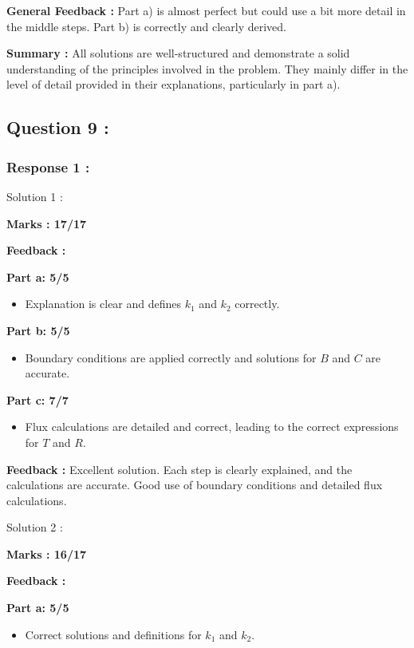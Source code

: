 \documentclass[a4paper,11pt]{article}
\begin{document}
\textbf{General Feedback :}
Part a) is almost perfect but could use a bit more detail in the middle steps. Part b) is correctly and clearly derived.

\textbf{Summary :}
All solutions are well-structured and demonstrate a solid understanding of the principles involved in the problem. They mainly differ in the level of detail provided in their explanations, particularly in part a).



\subsection*{Question 9 :}

\subsubsection*{Response 1 :}

Solution 1 : 

\textbf{Marks : 17/17}

\textbf{Feedback :}

\textbf{Part a: 5/5}
\begin{itemize}
    \item Explanation is clear and defines $k_1$ and $k_2$ correctly.
\end{itemize}


\textbf{Part b: 5/5}
\begin{itemize}
    \item Boundary conditions are applied correctly and solutions for $B$ and $C$ are accurate.
\end{itemize}

\textbf{Part c: 7/7}
\begin{itemize}
    \item Flux calculations are detailed and correct, leading to the correct expressions for $T$ and $R$.
\end{itemize}


\textbf{Feedback :}
Excellent solution. Each step is clearly explained, and the calculations are accurate. Good use of boundary conditions and detailed flux calculations.


Solution 2 :

\textbf{Marks : 16/17}

\textbf{Feedback :}

\textbf{Part a: 5/5}
\begin{itemize}
    \item Correct solutions and definitions for $k_1$ and $k_2$.
\end{itemize}
\end{document}
